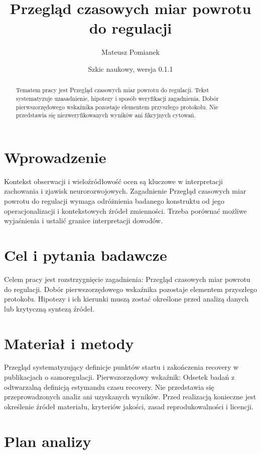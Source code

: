 \documentclass[11pt,a4paper]{article}
\title{Przegląd czasowych miar powrotu do regulacji}
\author{Mateusz Pomianek}
\date{Szkic naukowy, wersja 0.1.1}
\begin{document}
\maketitle

\begin{abstract}

Tematem pracy jest Przegląd czasowych miar powrotu do regulacji. Tekst systematyzuje uzasadnienie, hipotezy i sposób weryfikacji zagadnienia. Dobór pierwszorzędowego wskaźnika pozostaje elementem przyszłego protokołu. Nie przedstawia się niezweryfikowanych wyników ani fikcyjnych cytowań.

\end{abstract}

\section{Wprowadzenie}

Kontekst obserwacji i wieloźródłowość ocen są kluczowe w interpretacji zachowania i zjawisk neurorozwojowych. Zagadnienie Przegląd czasowych miar powrotu do regulacji wymaga odróżnienia badanego konstruktu od jego operacjonalizacji i kontekstowych źródeł zmienności. Trzeba porównać możliwe wyjaśnienia i ustalić granice interpretacji dowodów.

\section{Cel i pytania badawcze}

Celem pracy jest rozstrzygnięcie zagadnienia: Przegląd czasowych miar powrotu do regulacji. Dobór pierwszorzędowego wskaźnika pozostaje elementem przyszłego protokołu. Hipotezy i ich kierunki muszą zostać określone przed analizą danych lub krytyczną syntezą źródeł.

\section{Materiał i metody}

Przegląd systematyzujący definicje punktów startu i zakończenia recovery w publikacjach o samoregulacji. Pierwszorzędowy wskaźnik: Odsetek badań z odtwarzalną definicją estymandu czasu recovery. Nie przedstawia się przeprowadzonych analiz ani uzyskanych wyników. Przed realizacją konieczne jest określenie źródeł materiału, kryteriów jakości, zasad reprodukowalności i licencji.

\section{Plan analizy}
\end{document}
